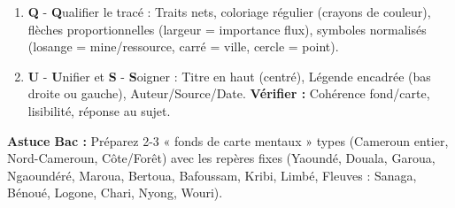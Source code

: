 \documentclass[11pt]{article}
\begin{document}
\begin{methode}
\begin{enumerate}
    \item \textbf{Q} - \textbf{Q}ualifier le tracé : Traits nets, coloriage régulier (crayons de couleur), flèches proportionnelles (largeur = importance flux), symboles normalisés (losange = mine/ressource, carré = ville, cercle = point).
    \item \textbf{U} - \textbf{U}nifier et \textbf{S} - \textbf{S}oigner : Titre en haut (centré), Légende encadrée (bas droite ou gauche), Auteur/Source/Date. \textbf{Vérifier :} Cohérence fond/carte, lisibilité, réponse au sujet.
\end{enumerate}
\textbf{Astuce Bac :} Préparez 2-3 « fonds de carte mentaux » types (Cameroun entier, Nord-Cameroun, Côte/Forêt) avec les repères fixes (Yaoundé, Douala, Garoua, Ngaoundéré, Maroua, Bertoua, Bafoussam, Kribi, Limbé, Fleuves : Sanaga, Bénoué, Logone, Chari, Nyong, Wouri).
\end{methode}
\end{document}
